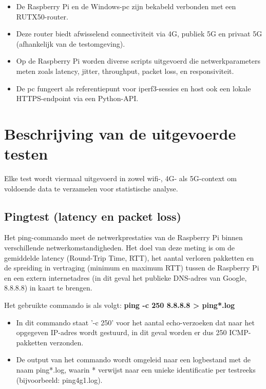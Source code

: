 \begin{itemize}
    \item De Raspberry Pi en de Windows-pc zijn bekabeld verbonden met een RUTX50-router.
    \item Deze router biedt afwisselend connectiviteit via 4G, publiek 5G en privaat 5G (afhankelijk van de testomgeving).
    \item Op de Raspberry Pi worden diverse scripts uitgevoerd die netwerkparameters meten zoals latency, jitter, throughput, packet loss, en responsiviteit.
    \item De pc fungeert als referentiepunt voor iperf3-sessies en host ook een lokale HTTPS-endpoint via een Python-API.
\end{itemize}

\section{Beschrijving van de uitgevoerde testen}

Elke test wordt viermaal uitgevoerd in zowel wifi-, 4G- als 5G-context om voldoende data te verzamelen voor statistische analyse.

\subsection{Pingtest (latency en packet loss)}
Het ping-commando meet de netwerkprestaties van de Raspberry Pi binnen verschillende netwerkomstandigheden. Het doel van deze meting is om de gemiddelde latency (Round-Trip Time, RTT), het aantal verloren pakketten en de spreiding in vertraging (minimum en maximum RTT) tussen de Raspberry Pi en een extern internetadres (in dit geval het publieke DNS-adres van Google, 8.8.8.8) in kaart te brengen.

Het gebruikte commando is als volgt: \textbf{ping -c 250 8.8.8.8 > ping*.log}

\begin{itemize}
    \item In dit commando staat ’-c 250’ voor het aantal echo-verzoeken dat naar het opgegeven IP-adres wordt gestuurd, in dit geval worden er dus 250 ICMP-pakketten verzonden. 
    \item De output van het commando wordt omgeleid naar een logbestand met de naam ping*.log, waarin * verwijst naar een unieke identificatie per testreeks (bijvoorbeeld: ping4g1.log).
\end{itemize}


